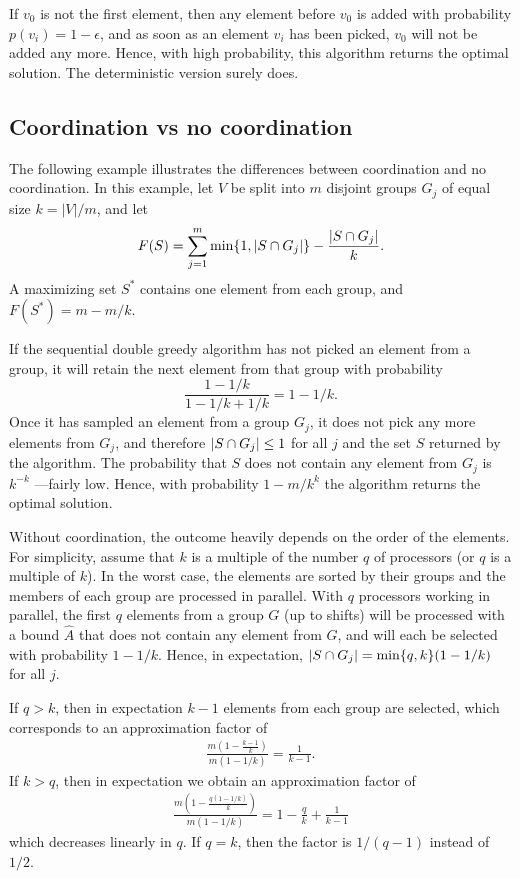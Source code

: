 If $v_0$ is not the first element, then any element before $v_0$ is added with probability $p(v_i) = 1-\epsilon$, and as soon as an element $v_i$ has been picked, $v_0$ will not be added any more. Hence, with high probability, this algorithm returns the optimal solution. The deterministic version surely does.


\subsection{Coordination vs no coordination}
The following example illustrates the differences between coordination and no coordination.
In this example, let $V$ be split into $m$ disjoint groups $G_j$ of equal size $k = |V|/m$, and let
\begin{equation}
  \label{eq:1}
  F(S) = \sum_{j=1}^m \min\{1, |S \cap G_j|\} - \frac{|S \cap G_j|}{k}.
\end{equation}
A maximizing set $S^*$ contains one element from each group, and $F(S^*) = m - m/k$.

If the sequential double greedy algorithm has not picked an element from a group, it will retain the next element from that group with probability
\begin{equation}
  \label{eq:2}
  \frac{1 - 1/k}{1 - 1/k + 1/k} = 1 - 1/k.
\end{equation}
Once it has sampled an element from a group $G_j$, it does not pick any more elements from $G_j$, and therefore $|S \cap G_j| \leq 1$ for all $j$ and the set $S$ returned by the algorithm. The probability that $S$ does not contain any element from $G_j$ is $k^{-k}$ ---fairly low. Hence, with probability $1-m/k^k$ the algorithm returns the optimal solution.

Without coordination, the outcome heavily depends on the order of the elements. For simplicity, assume that $k$ is a multiple of the number $q$ of processors (or $q$ is a multiple of $k$). 
In the worst case, the elements are sorted by their groups and the members of each group are processed in parallel. With $q$ processors working in parallel, the first $q$ elements from a group $G$ (up to shifts) will be processed with a bound $\hat{A}$ that does not contain any element from $G$, and will each be selected with probability $1-1/k$. Hence, in expectation, $|S \cap G_j| = \min\{q,k\}(1-1/k)$ for all $j$. 

If $q > k$, then in expectation $k-1$ elements from each group are selected, which corresponds to an approximation factor of
\begin{align}
  \frac{m( 1 - \frac{k-1}{k})}{m(1-1/k)} = \frac{1}{k-1}.
\end{align}
If $k > q$, then in expectation we obtain an approximation factor of
\begin{align}
  \frac{m(1 - \frac{q(1-1/k)}{k})}{m(1-1/k)} = 1 - \frac{q}{k} + \frac{1}{k-1} %
\end{align}
which decreases linearly in $q$.
If $q=k$, then the factor is $1/(q-1)$ instead of $1/2$.